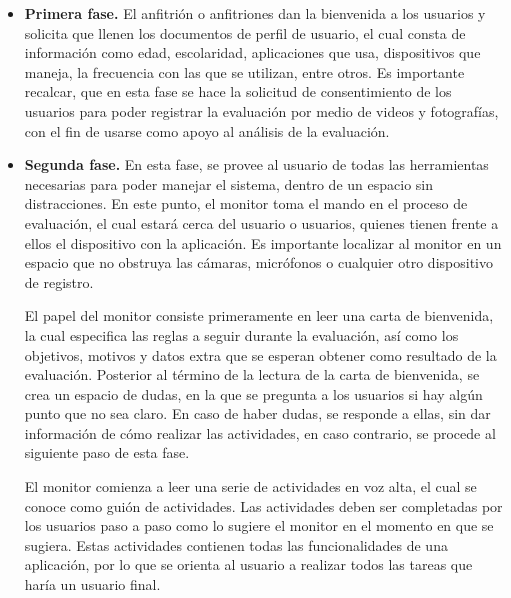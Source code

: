 \begin{itemize}
  \item \textbf{Primera fase.} El anfitrión o anfitriones dan la bienvenida a los usuarios y solicita que llenen los documentos de perfil de usuario, el cual consta de información como edad, escolaridad, aplicaciones que usa, dispositivos que maneja, la frecuencia con las que se utilizan, entre otros. Es importante recalcar, que en esta fase se hace la solicitud de consentimiento de los usuarios para poder registrar la evaluación por medio de videos y fotografías, con el fin de usarse como apoyo al análisis de la evaluación.
  \item \textbf{Segunda fase.} En esta fase, se provee al usuario de todas las herramientas necesarias para poder manejar el sistema, dentro de un espacio sin distracciones. En este punto, el monitor toma el mando en el proceso de evaluación, el cual estará cerca del usuario o usuarios, quienes tienen frente a ellos el dispositivo con la aplicación. Es importante localizar al monitor en un espacio que no obstruya las cámaras, micrófonos o cualquier otro dispositivo de registro.
  
  El papel del monitor consiste primeramente en leer una carta de bienvenida, la cual especifica las reglas a seguir durante la evaluación, así como los objetivos, motivos y datos extra que se esperan obtener como resultado de la evaluación. Posterior al término de la lectura de la carta de bienvenida, se crea un espacio de dudas, en la que se pregunta a los usuarios si hay algún punto que no sea claro. En caso de haber dudas, se responde a ellas, sin dar información de cómo realizar las actividades, en caso contrario, se procede al siguiente paso de esta fase.
  
  El monitor comienza a leer una serie de actividades en voz alta, el cual se conoce como guión de actividades. Las actividades deben ser completadas por los usuarios paso a paso como lo sugiere el monitor en el momento en que se sugiera. Estas actividades contienen todas las funcionalidades de una aplicación, por lo que se orienta al usuario a realizar todos las tareas que haría un usuario final.
  

\end{itemize}
